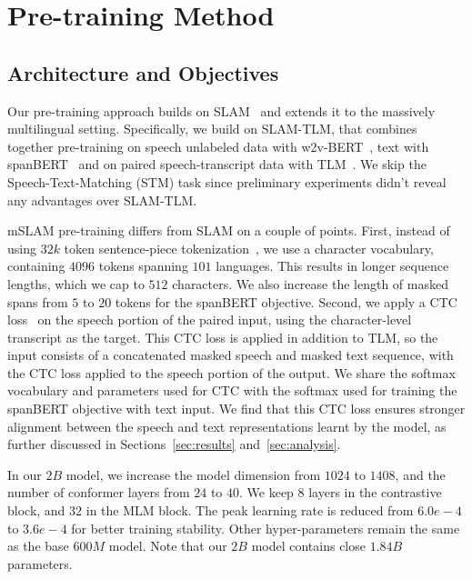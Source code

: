\documentclass[nohyperref]{article}
\newcommand{\mslam}{mSLAM}
\begin{document}
\section{Pre-training Method}
\label{sec:pretraining}

\subsection{Architecture and Objectives}
\label{subsec:pretrain-arch}

Our pre-training approach builds on SLAM~\citep{bapna2021slam} and extends it to the massively multilingual setting. Specifically, we build on SLAM-TLM, that combines together pre-training on speech unlabeled data with w2v-BERT~\cite{chung2021w2v}, text with spanBERT~\cite{Joshi2020SpanBERTIP} and on paired speech-transcript data with TLM~\cite{conneau2019cross}. We skip the Speech-Text-Matching (STM) task since preliminary experiments didn't reveal any advantages over SLAM-TLM.




\mslam{} pre-training differs from SLAM on a couple of points. First, instead of using $32k$ token sentence-piece tokenization~\citep{kudo-richardson-2018-sentencepiece}, we use a character vocabulary, containing $4096$ tokens spanning $101$ languages. This results in longer sequence lengths, which we cap to $512$ characters. We also increase the length of masked spans from $5$ to $20$ tokens for the spanBERT objective. Second, we apply a CTC loss~\citep{graves2006connectionist,graves2014towards} on the speech portion of the paired input, using the character-level transcript as the target. This CTC loss is applied in addition to TLM, so the input consists of a concatenated masked speech and masked text sequence, with the CTC loss applied to the speech portion of the output. We share the softmax vocabulary and parameters used for CTC with the softmax used for training the spanBERT objective with text input. We find that this CTC loss ensures stronger alignment between the speech and text representations learnt by the model, as further discussed in Sections~\ref{sec:results} and~\ref{sec:analysis}.

In our $2B$ model, we increase the model dimension from $1024$ to $1408$, and the number of conformer layers from $24$ to $40$. We keep $8$ layers in the contrastive block, and $32$ in the MLM block. The peak learning rate is reduced from $6.0e-4$ to $3.6e-4$ for better training stability. Other hyper-parameters remain the same as the base $600M$ model. Note that our $2B$ model contains close $1.84B$ parameters.
\end{document}
